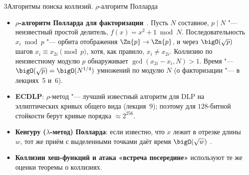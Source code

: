 \begin{lecture}{3}{Алгоритмы поиска коллизий. \texorpdfstring{$\rho$}{ρ}-алгоритм Полларда}
\begin{itemize}
  \item \textbf{$\rho$-алгоритм Полларда для факторизации}~\cite{pollard-rho-factor}. Пусть
    $N$ составное, $p \mid N$ "--- неизвестный простой делитель, $f(x) = x^2 + 1 \bmod N$.
    Последовательность $x_i \bmod p$ "--- орбита отображения $\Zn{p} \to \Zn{p}$, и через
    $\bigO(\sqrt p)$ шагов $x_i \equiv x_{2i} \pmod p$, хотя, как правило,
    $x_i \ne x_{2i}$. Коллизию по неизвестному модулю $p$ обнаруживает
    $\gcd(x_{2i} - x_i, N) > 1$. Время "--- $\bigO(\sqrt p) = \bigO(N^{1/4})$ умножений по
    модулю $N$ (о факторизации "--- в лекциях~5 и~6).
  \item \textbf{ECDLP}: $\rho$-метод "--- лучший известный алгоритм для DLP на эллиптических кривых
    общего вида (лекция~9); поэтому для $128$-битной стойкости берут кривые порядка
    $\approx 2^{256}$.
  \item \textbf{Кенгуру ($\lambda$-метод) Полларда}: если известно, что $x$ лежит в отрезке длины $w$,
    тот же приём с выделенными точками даёт время $\bigO(\sqrt w)$
    \cite[разд.~14.5]{galbraith}.
  \item \textbf{Коллизии хеш-функций и атака «встреча посередине»} используют те же оценки
    теоремы о коллизиях.
\end{itemize}

\checkyourselfsection

\begin{furtherreading}
\end{furtherreading}
\end{lecture}
